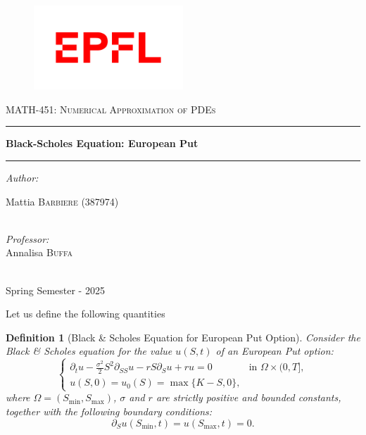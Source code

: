 \documentclass{article}
\newtheorem{df}{Definition}[section]
\begin{document}
\thispagestyle{empty}

\begin{figure}
\centering
\includegraphics[width=0.5\textwidth]{code/images/LOGO.png}
\end{figure}
\vspace{0.5cm}
\begin{center}
\textsc{ \Large MATH-451: Numerical Approximation of PDEs}
\vspace{1.5cm}
\hrule
\vspace{0.5cm}
{\huge \bfseries Black-Scholes Equation: European Put}
\vspace{0.5cm}
\hrule
\vspace{1.5cm}


\emph{\Large \centering Author:}\\
\vspace{0.3cm}

\large Mattia \textsc{\large Barbiere} (387974)\\

~

\vspace{0.5cm}


\emph{\Large \centering Professor:}\\
\vspace{0.3cm}
\large  Annalisa  \textsc{\large Buffa}\\
~

\vspace{0.5cm}

\large Spring Semester - 2025

\end{center}

\clearpage
{}

Let us define the following quantities
\begin{df}[Black \& Scholes Equation for European Put Option]\label{def:problem}
Consider the Black \& Scholes equation for the value \( u(S, t) \) of an European Put option:
\[
\begin{cases}
\partial_t u - \frac{\sigma^2}{2} S^2 \partial_{SS} u - r S \partial_S u + r u = 0 & \text{in } \Omega \times (0, T], \\
u(S, 0) = u_0(S) = \max \{ K - S, 0 \},
\end{cases}
\]
where \(\Omega = (S_{\min}, S_{\max})\), \(\sigma\) and \(r\) are strictly positive and bounded constants, together with the following boundary conditions:
\[
\partial_S u(S_{\min}, t) = u(S_{\max}, t) = 0.
\]
\end{df}
\end{document}
